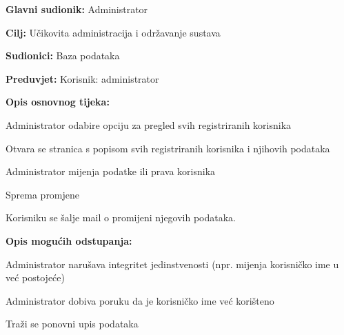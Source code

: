 					
					\noindent {}
						\begin{packed_item}
						
						\item \textbf{Glavni sudionik: } Administrator
						\item  \textbf{Cilj:} Učikovita administracija i održavanje sustava
						\item  \textbf{Sudionici:} Baza podataka
						\item  \textbf{Preduvjet:}  Korisnik: administrator 
						\item  \textbf{Opis osnovnog tijeka:}
						
						\item[] \begin{packed_enum}
							\item Administrator odabire opciju za pregled svih registriranih korisnika
							\item Otvara se stranica s popisom svih registriranih korisnika i njihovih podataka
							\item Administrator mijenja podatke ili prava korisnika
							\item Sprema promjene			
							\item Korisniku se šalje mail o promijeni njegovih podataka.
						\end{packed_enum}
						
						\item  \textbf{Opis mogućih odstupanja:}
						
						\item[] \begin{packed_item}
							
							\item[3.a]Administrator narušava integritet jedinstvenosti (npr. mijenja korisničko ime u već postojeće)
							\item[] \begin{packed_enum}
								
								\item Administrator dobiva poruku da je korisničko ime već korišteno
								\item Traži se ponovni upis podataka
								
							\end{packed_enum}
								
							\end{packed_item}
							
						\end{packed_item}
						
